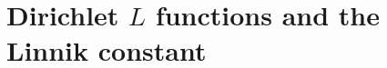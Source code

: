 \chapter{Dirichlet \texorpdfstring{$L$}{L} functions and the Linnik constant}\label{vol1:ch16}









